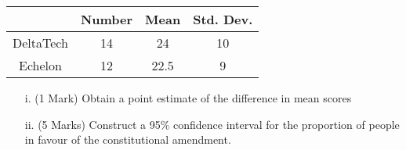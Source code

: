 \documentclass[]{article}
\begin{document}
\begin{itemize}
\begin{center}
\begin{tabular}{|c|c|c|c|}

  \hline
	&Number&	Mean&	Std. Dev.\\ \hline
DeltaTech	&14	&24	&10\\
Echelon	&12	&22.5	&9\\
  \hline
\end{tabular}
\end{center}

\begin{itemize}
\item [i.](1 Mark) Obtain a point estimate of the difference in mean scores
\item [ii.](5 Marks) Construct a 95\% confidence interval for the proportion of people in favour of the constitutional amendment.
\end{itemize}
\end{itemize}
\end{document}
